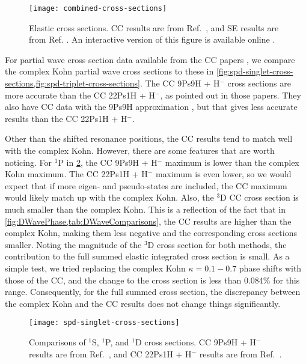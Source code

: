 \documentclass[Dissertation.tex]{subfiles}
\begin{document}
\begin{figure}
	\centering
	\texttt{[image: combined-cross-sections]}
	\caption[Cross sections]{Elastic cross sections. CC results are from Ref.~\cite{Walters2004}, and SE results are from Ref. \cite{Hara1975}. An interactive version of this figure is available online \cite{Plotly}.}
	\label{fig:combined-cross-sections}
\end{figure}

For partial wave cross section data available from the CC papers
\cite{Walters2004,Blackwood2002,Blackwood2002b}, we compare the complex Kohn
partial wave cross sections to these in
\cref{fig:spd-singlet-cross-sections,fig:spd-triplet-cross-sections}.
The CC 9Ps9H + H$^-$ cross sections are more accurate than the CC 22Ps1H + H$^-$,
as pointed out in those papers. They also have CC data with the 9Ps9H
approximation \cite{Blackwood2002}, but that gives less accurate results than
the CC 22Ps1H + H$^-$.

Other than the shifted resonance positions, the CC results tend to match well
with the complex Kohn. However, there are some features that are worth
noticing. For $^1$P in \cref{fig:spd-singlet-cross-sections}, the CC
9Ps9H + H$^-$ maximum is lower than the complex Kohn maximum. The CC
22Ps1H + H$^-$ maximum is even lower, so we would expect that if more
eigen- and pseudo-states are included, the CC maximum would likely match up 
with the complex Kohn. Also, the $^3$D CC cross section is much smaller than
the complex Kohn. This is a reflection of the fact that in
\cref{fig:DWavePhase,tab:DWaveComparisons}, the CC results are higher than the
complex Kohn, making them less negative and the corresponding cross sections
smaller. Noting the magnitude of the $^3$D cross section for both methods, the
contribution to the full summed elastic integrated cross section is small.
As a simple test, we tried replacing the complex Kohn $\kappa = 0.1 - 0.7$
phase shifts with those of the CC, and the change to the cross section is
less than 0.084\% for this range. Consequently, for the full summed
cross section, the discrepancy between the complex Kohn and the CC results
does not change things significantly.

\begin{figure}
	\centering
	\texttt{[image: spd-singlet-cross-sections]}
	\caption[Comparisons of $^1$S, $^1$P, and $^1$D cross sections.]{Comparisons of $^1$S, $^1$P, and $^1$D cross sections. CC 9Ps9H + H$^-$ results are from Ref.~\cite{Walters2004}, and CC 22Ps1H + H$^-$ results are from Ref.~\cite{Blackwood2002b}.}
	\label{fig:spd-singlet-cross-sections}
\end{figure}
\end{document}
